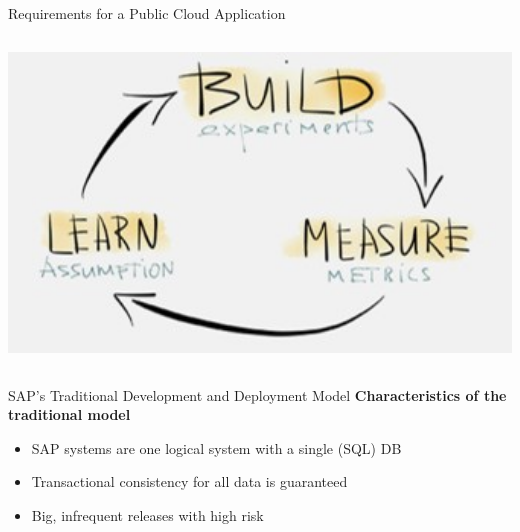 \begin{frame}{Requirements for a Public Cloud Application}
\begin{columns}
\begin{column}{.28\textwidth}
		\vspace{0.5cm}
		\includegraphics[width=1.2\textwidth]{../MicroServiceArchitecture/images/BuildMeasureLearn}
	\end{column}
	\end{columns}
\end{frame}


\begin{frame}{\large SAP's Traditional Development and Deployment Model}
\textbf{Characteristics of the traditional model}
\begin{itemize}
	\item SAP systems are one logical system with a single (SQL) DB
	\item Transactional consistency for all data is guaranteed
	\item Big, infrequent releases with high risk
\end{itemize}

\vspace{5mm}

\end{frame}


